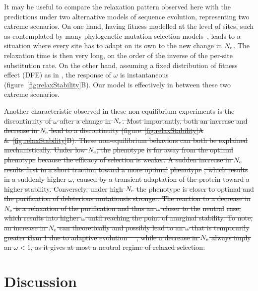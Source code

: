 \documentclass[authoryear]{elsarticle} %
\providecommand{\DIFdeltex}[1]{{\protect\color{red}\sout{#1}}}                      %
\providecommand{\DIFdelbegin}{} %
\providecommand{\DIFdelend}{} %
\providecommand{\DIFdel}[1]{\texorpdfstring{\DIFdeltex{#1}}{}} %
\begin{document}
It may be useful to compare the relaxation pattern observed here with the predictions under two alternative models of sequence evolution, representing two extreme scenarios.
On one hand, having fitness modelled at the level of sites, such as contemplated by many phylogenetic mutation-selection models~\citep{Halpern1998, Rodrigue2010, Tamuri2012}, leads to a situation where every site has to adapt on its own to the new change in $N_{\text{e}}$.
The relaxation time is then very long, on the order of the inverse of the per-site {substitution} rate.
On the other hand, assuming a fixed distribution of fitness effect ({DFE}) as in \citet{Welch2008}, the response of $\omega$ is instantaneous (figure~\ref{fig:relaxStability}B).
Our model is effectively in between these two extreme scenarios.

\DIFdelbegin \DIFdel{Another characteristic observed in these non-equilibrium experiments is the discontinuity of $\omega$ after a change in $N_{\text{e}}$.
Most importantly, both an increase and decrease in $N_{\text{e}}$ lead to a discontinuity (figure~\ref{fig:relaxStability}A \&~\ref{fig:relaxStability}B).
These non-equilibrium behaviors can both be explained mechanistically.
Under low $N_{\text{e}}$, the }%
\DIFdel{phenotype}%
\DIFdel{is far away from the optimal }%
\DIFdel{phenotype}%
\DIFdel{because the efficacy of selection is weaker.
A sudden increase in $N_{\text{e}}$ results first in a short traction toward a more optimal }%
\DIFdel{phenotype }%
\DIFdel{, which results in a suddenly higher $\omega$, caused by a transient adaptation of the protein toward a higher stability.
Conversely, under high $N_{\text{e}}$ the }%
\DIFdel{phenotype }%
\DIFdel{is closer to optimal and the purification of deleterious mutationsis stronger.
The reaction to a decrease in $N_{\text{e}}$ is a relaxation of the purification and thus an $\omega$ closer to the }%
\DIFdel{neutral}%
\DIFdel{case, which results into higher $\omega$ until reaching the point of marginal stability.
To note, an increase in $N_{\text{e}}$ can theoretically and possibly lead to an $\omega$ that is temporarily greater than 1 due to adaptive evolution~\mbox{%
\citep{Jones2016}}\hspace{0pt}%
, while a decrease in $N_{\text{e}}$ always imply an $\omega < 1$, as it gives at most a }%
\DIFdel{neutral}%
\DIFdel{regime of relaxed selection.
}%

\DIFdelend \section{Discussion}
\DIFdelbegin %
\end{document}
